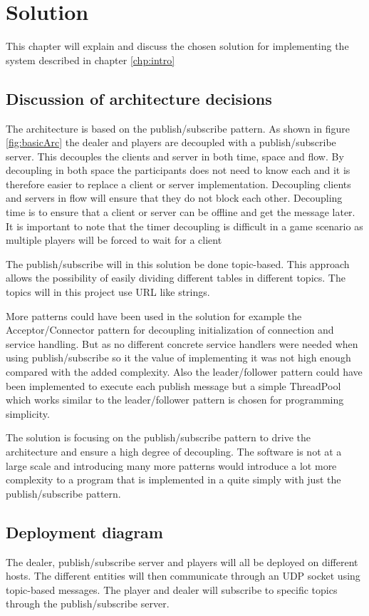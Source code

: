 \chapter{Solution}
This chapter will explain and discuss the chosen solution for implementing the system described in chapter \ref{chp:intro}

\section{Discussion of architecture decisions}
The architecture is based on the publish/subscribe pattern. As shown in figure \ref{fig:basicArc} the dealer and players are decoupled with a publish/subscribe server. This decouples the clients and server in both time, space and flow. By decoupling in both space the participants does not need to know each and it is therefore easier to replace a client or server implementation. Decoupling clients and servers in flow will ensure that they do not block each other. Decoupling time is to ensure that a client or server can be offline and get the message later. It is important to note that the timer decoupling is difficult in a game scenario as multiple players will be forced to wait for a client


The publish/subscribe will in this solution be done topic-based. This approach allows the possibility of easily dividing different tables in different topics. The topics will in this project use URL like strings.

More patterns could have been used in the solution for example the Acceptor/Connector pattern for decoupling initialization of connection and service handling. But as no different concrete service handlers were needed when using publish/subscribe so it the value of implementing it was not high enough compared with the added complexity. Also the leader/follower pattern could have been implemented to execute each publish message but a simple ThreadPool which works similar to the leader/follower pattern is chosen for programming simplicity.

The solution is focusing on the publish/subscribe pattern to drive the architecture and ensure a high degree of decoupling. The software is not at a large scale and introducing many more patterns would introduce a lot more complexity to a program that is implemented in a quite simply with just the publish/subscribe pattern.

\section{Deployment diagram}
The dealer, publish/subscribe server and players will all be deployed on different hosts. The different entities will then communicate through an UDP socket using topic-based messages. The player and dealer will subscribe to specific topics through the publish/subscribe server.

